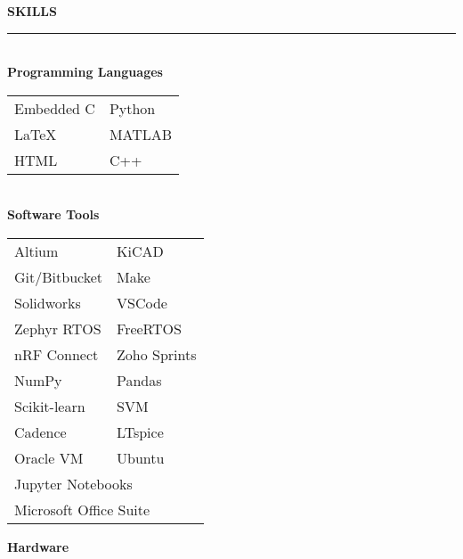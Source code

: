 \documentclass[10pt,letterpaper]{article}
\def\bulletspace{0.1mm} %
\newcommand{\header}[2] {
    \vspace{10pt}
        {\LARGE\faIcon{#1}}\hspace{0.5em}\textbf{\LARGE{\uppercase{#2} } }
        \vspace{-5pt} \\
        \rule{0.1 \textwidth}{1pt}\hfill \\
}
\newcommand{\bulletp}{
    \textbullet \hspace{\bulletspace}
}
\begin{document}
\begin{paracol}{2}
\begin{leftcolumn}
    \vspace{1em}
    \header{cogs}{SKILLS}
    \large{\textbf{Programming Languages} }\\
    \vspace{-1.8em}
    \raggedright{
        \begin{table}[h!]
            \begin{tabular}{p{7em} p{7em}}
                \bulletp Embedded C & \bulletp Python \\
                \bulletp LaTeX & \bulletp MATLAB \\
                \bulletp HTML & \bulletp C++\\
            \end{tabular}
        \end{table}
    } \\
    \vspace{-8pt}
    \large{\textbf{Software Tools} }\\
    \vspace{-0.55em}
    \raggedright{
        \begin{table}[h!]
            \begin{tabular}{p{7em} p{7em}}
                \bulletp Altium & \bulletp KiCAD\\
                \bulletp Git/Bitbucket & \bulletp Make\\
                \bulletp Solidworks & \bulletp VSCode\\
                \bulletp Zephyr RTOS & \bulletp FreeRTOS\\
                \bulletp nRF Connect & \bulletp Zoho Sprints\\
                \bulletp NumPy & \bulletp Pandas\\
                \bulletp Scikit-learn & \bulletp SVM\\
                \bulletp Cadence & \bulletp LTspice\\
                \bulletp Oracle VM & \bulletp Ubuntu\\
                \multicolumn{2}{l}{\bulletp Jupyter Notebooks}\\
                \multicolumn{2}{l}{\bulletp Microsoft Office Suite}\\
            \end{tabular}
        \end{table}
    }
    \vspace{-10pt}
    \large{\textbf{Hardware} }\\ %

\end{leftcolumn}
\end{paracol}
\end{document}
